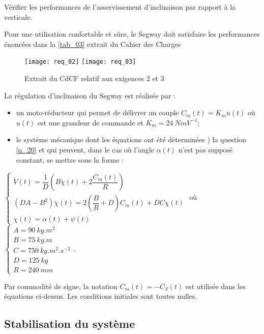 \begin{obj}
Vérifier les performances de l’asservissement d’inclinaison par rapport à la verticale.
\end{obj}

\ifprof
\else

Pour une utilisation confortable et sûre, le Segway doit satisfaire les performances énoncées dans la \autoref{tab_03} extrait du Cahier des Charges


\begin{figure}[H]
\centering
\texttt{[image: req\_02]}
\hfill
\texttt{[image: req\_03]}
\caption{Extrait du CdCF relatif aux exigences 2 et 3 \label{tab_03} }
\end{figure}


La régulation d’inclinaison du Segway est réalisée par :
\begin{itemize}
\item un moto-réducteur qui permet de délivrer un couple $C_m(t)=K_m u(t)$ où $u(t)$ est une grandeur de commande et  $K_m = \SI{24}{NmV^{-1}}$;
\item le système mécanique dont les équations ont été déterminées ) la question \ref{q_20} et qui peuvent, dans le cas où l’angle $\alpha(t)$ n’est pas supposé constant, se mettre sous la forme :
\end{itemize}

$
\left\{
\begin{array}{l}
\dot{V}(t) = \dfrac{1}{D} \left(B\ddot{\chi}(t)+2\dfrac{C_m(t)}{R}\right) \\
\left(DA -B^2 \right) \ddot{\chi}(t) = 2\left(\dfrac{B}{R}+D\right)C_m(t) + DC\chi(t) \\
\chi(t)=\alpha(t)+\psi(t) 
 \end{array}
\right.
$
où 
$
\left\{
\begin{array}{l}
A = \SI{90}{kg.m^2} \\
B = \SI{75}{kg.m} \\
C = \SI{750}{kg.m^2.s^{-2}} \\
D = \SI{125}{kg} \\
R = \SI{240}{mm} 
\end{array}
\right.
$.


Par commodité de signe, la notation $C_m(t)=-C_S(t)$ est utilisée dans les équations ci-dessus. Les conditions initiales sont toutes nulles.

\fi

\subsection{Stabilisation du système}

